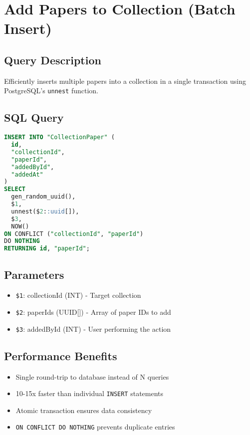 \section{Add Papers to Collection (Batch Insert)}
\label{sec:query-batch-insert}

\subsection{Query Description}
Efficiently inserts multiple papers into a collection in a single transaction using PostgreSQL's \texttt{unnest} function.

\subsection{SQL Query}
\begin{lstlisting}[language=SQL, caption={Batch Insert Papers to Collection}]
INSERT INTO "CollectionPaper" (
  id, 
  "collectionId", 
  "paperId", 
  "addedById", 
  "addedAt"
)
SELECT 
  gen_random_uuid(), 
  $1, 
  unnest($2::uuid[]), 
  $3, 
  NOW()
ON CONFLICT ("collectionId", "paperId") 
DO NOTHING
RETURNING id, "paperId";
\end{lstlisting}

\subsection{Parameters}
\begin{itemize}[leftmargin=*,topsep=3pt,itemsep=2pt]
    \item \texttt{\$1}: collectionId (INT) - Target collection
    \item \texttt{\$2}: paperIds (UUID[]) - Array of paper IDs to add
    \item \texttt{\$3}: addedById (INT) - User performing the action
\end{itemize}

\subsection{Performance Benefits}
\begin{itemize}[leftmargin=*,topsep=3pt,itemsep=2pt]
    \item Single round-trip to database instead of N queries
    \item 10-15x faster than individual \texttt{INSERT} statements
    \item Atomic transaction ensures data consistency
    \item \texttt{ON CONFLICT DO NOTHING} prevents duplicate entries
\end{itemize}

